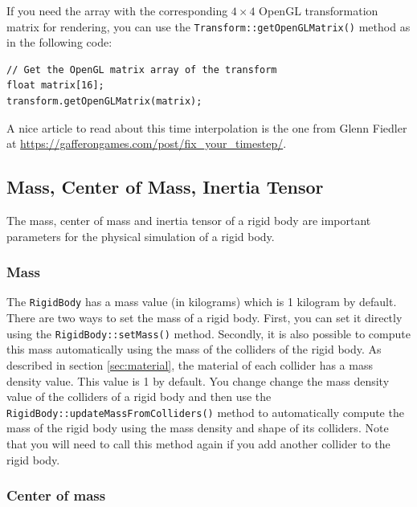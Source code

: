 \documentclass[a4paper,12pt]{article}
\begin{document}
    \vspace{0.6cm}

    If you need the array with the corresponding $4 \times 4$ OpenGL transformation matrix for rendering, you can use
    the \texttt{Transform::getOpenGLMatrix()} method as in the following code: \\

    \begin{lstlisting}
// Get the OpenGL matrix array of the transform
float matrix[16];
transform.getOpenGLMatrix(matrix);
  \end{lstlisting}

    \vspace{0.6cm}

    A nice article to read about this time interpolation is the one from Glenn Fiedler at \url{https://gafferongames.com/post/fix_your_timestep/}.

    \subsection{Mass, Center of Mass, Inertia Tensor}
    \label{sec:rigidbodymass}

    The mass, center of mass and inertia tensor of a rigid body are important parameters for the physical simulation of a rigid body.

    \subsubsection{Mass}

    The \texttt{RigidBody} has a mass value (in kilograms) which is 1 kilogram by default. There are two ways to set the mass of a rigid body. First, you
    can set it directly using the \texttt{RigidBody::setMass()} method. Secondly, it is also possible to compute this mass
    automatically using the mass of the colliders of the rigid body. As described in section \ref{sec:material}, the material of each collider has a 
    mass density value. This value is 1 by default. You change change the mass density value of the colliders of a rigid body and then use the
    \texttt{RigidBody::updateMassFromColliders()} method to automatically compute the mass of the rigid body using the mass density and shape of
    its colliders. Note that you will need to call this method again if you add another collider to the rigid body.

    \subsubsection{Center of mass}
\end{document}
